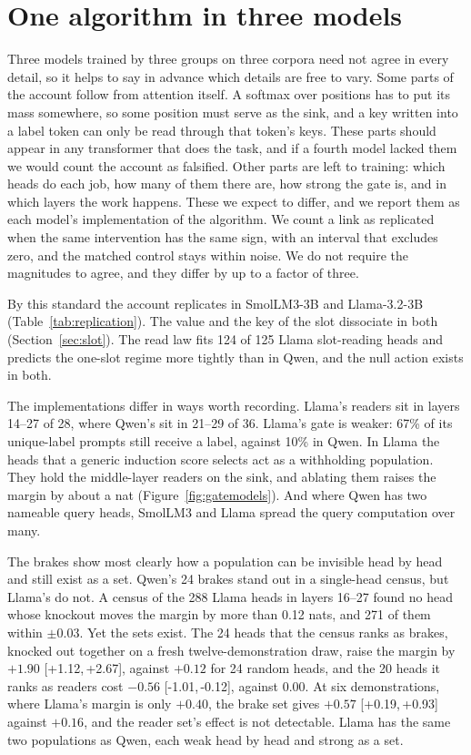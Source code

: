 \documentclass{article}
\newcommand{\ci}[2]{[#1,\,#2]}
\begin{document}
\section{One algorithm in three models}\label{sec:replication}
Three models trained by three groups on three corpora need not agree in every detail, so it helps to say in advance which details are free to vary. Some parts of the account follow from attention itself. A softmax over positions has to put its mass somewhere, so some position must serve as the sink, and a key written into a label token can only be read through that token's keys. These parts should appear in any transformer that does the task, and if a fourth model lacked them we would count the account as falsified. Other parts are left to training: which heads do each job, how many of them there are, how strong the gate is, and in which layers the work happens. These we expect to differ, and we report them as each model's implementation of the algorithm. We count a link as replicated when the same intervention has the same sign, with an interval that excludes zero, and the matched control stays within noise. We do not require the magnitudes to agree, and they differ by up to a factor of three.

By this standard the account replicates in SmolLM3-3B and Llama-3.2-3B (Table~\ref{tab:replication}). The value and the key of the slot dissociate in both (Section~\ref{sec:slot}). The read law fits 124 of 125 Llama slot-reading heads and predicts the one-slot regime more tightly than in Qwen, and the null action exists in both.

The implementations differ in ways worth recording. Llama's readers sit in layers 14--27 of 28, where Qwen's sit in 21--29 of 36. Llama's gate is weaker: 67\% of its unique-label prompts still receive a label, against 10\% in Qwen. In Llama the heads that a generic induction score selects act as a withholding population. They hold the middle-layer readers on the sink, and ablating them raises the margin by about a nat (Figure~\ref{fig:gatemodels}). And where Qwen has two nameable query heads, SmolLM3 and Llama spread the query computation over many.

The brakes show most clearly how a population can be invisible head by head and still exist as a set. Qwen's 24 brakes stand out in a single-head census, but Llama's do not. A census of the 288 Llama heads in layers 16--27 found no head whose knockout moves the margin by more than 0.12 nats, and 271 of them within $\pm 0.03$. Yet the sets exist. The 24 heads that the census ranks as brakes, knocked out together on a fresh twelve-demonstration draw, raise the margin by $+1.90$ \ci{+1.12}{+2.67}, against $+0.12$ for 24 random heads, and the 20 heads it ranks as readers cost $-0.56$ \ci{-1.01}{-0.12}, against $0.00$. At six demonstrations, where Llama's margin is only $+0.40$, the brake set gives $+0.57$ \ci{+0.19}{+0.93} against $+0.16$, and the reader set's effect is not detectable. Llama has the same two populations as Qwen, each weak head by head and strong as a set.
\end{document}
